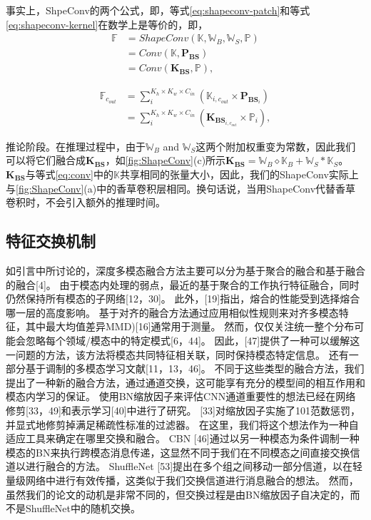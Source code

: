 事实上，ShpeConv的两个公式，即，等式\ref{eq:shapeconv-patch}和等式\ref{eq:shapeconv-kernel}在数学上是等价的，即，
\begin{equation}
	\begin{aligned}
		\mathbb{F} &= ShapeConv(\mathbb{K}, \mathbb{W}_B, \mathbb{W}_S, \mathbb{P})\\
		&= Conv(\mathbb{K}, \textbf{P}_\textbf{BS})\\
		&= Conv(\textbf{K}_\textbf{BS}, \mathbb{P}),
	\end{aligned}
\end{equation}

\begin{equation}
	\begin{aligned}
		\mathbb{F}_{c_{out}} &= \sum_{i}^{K_h \times K_w \times C_{in}} (\mathbb{K}_{i,{c_{out}}} \times \textbf{P}_{\textbf{BS}_{i}})\\
		&= \sum_{i}^{K_h \times K_w \times C_{in}} (\textbf{K}_{\textbf{BS}_{i,{c_{out}}}} \times \mathbb{P}_{i}),
	\end{aligned}
\end{equation}


推论阶段。在推理过程中，由于$\mathbb{W}_B$ and $\mathbb{W}_S$这两个附加权重变为常数，因此我们可以将它们融合成$\textbf{K}_\textbf{BS}$，如\ref{fig:ShapeConv}(c)所示$\textbf{K}_\textbf{BS} = \mathbb{W}_B \diamond \mathbb{K}_B+ \mathbb{W}_S \ast \mathbb{K}_S$。
$\textbf{K}_\textbf{BS}$与等式\ref{eq:conv}中的$\mathbb{K}$共享相同的张量大小，因此，我们的ShapeConv实际上与\ref{fig:ShapeConv}(a)中的香草卷积层相同。换句话说，当用ShapeConv代替香草卷积时，不会引入额外的推理时间。


\subsection{特征交换机制}
如引言中所讨论的，深度多模态融合方法主要可以分为基于聚合的融合和基于融合的融合[4]。
由于模态内处理的弱点，最近的基于聚合的工作执行特征融合，同时仍然保持所有模态的子网络[12，30]。
此外，[19]指出，熔合的性能受到选择熔合哪一层的高度影响。
基于对齐的融合方法通过应用相似性规则来对齐多模态特征，其中最大均值差异MMD)[16]通常用于测量。
然而，仅仅关注统一整个分布可能会忽略每个领域/模态中的特定模式[6，44]。
因此，[47]提供了一种可以缓解这一问题的方法，该方法将模态共同特征相关联，同时保持模态特定信息。
还有一部分基于调制的多模态学习文献[11，13，46]。
不同于这些类型的融合方法，我们提出了一种新的融合方法，通过通道交换，这可能享有充分的模型间的相互作用和模态内学习的保证。
使用BN缩放因子来评估CNN通道重要性的想法已经在网络修剪[33，49]和表示学习[40]中进行了研究。
[33]对缩放因子实施了101范数惩罚，并显式地修剪掉满足稀疏性标准的过滤器。
在这里，我们将这个想法作为一种自适应工具来确定在哪里交换和融合。
CBN [46]通过以另一种模态为条件调制一种模态的BN来执行跨模态消息传递，这显然不同于我们在不同模态之间直接交换信道以进行融合的方法。
ShuffleNet [53]提出在多个组之间移动一部分信道，以在轻量级网络中进行有效传播，这类似于我们交换信道进行消息融合的想法。
然而，虽然我们的论文的动机是非常不同的，但交换过程是由BN缩放因子自决定的，而不是ShuffleNet中的随机交换。








